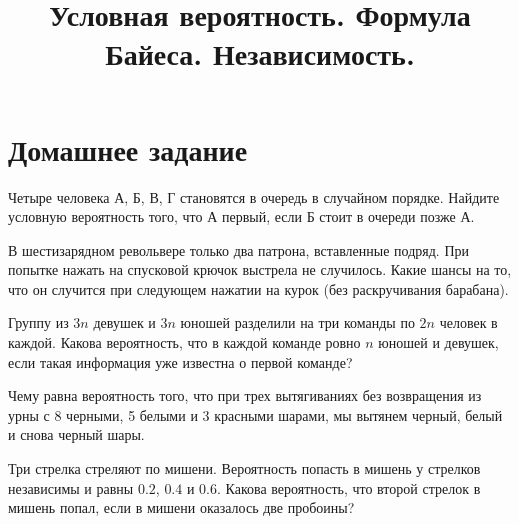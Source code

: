

\title{Условная вероятность. Формула Байеса. Независимость.} 
\date{\vspace{-1cm}}


\maketitle

\section*{Домашнее задание}
\begin{problem}
    Четыре человека А, Б, В, Г становятся в очередь в случайном порядке.
    Найдите условную вероятность того, что А первый, если Б стоит в очереди позже А.
\end{problem}

\begin{problem}
    В шестизарядном револьвере только два патрона, вставленные подряд.
    При попытке нажать на спусковой крючок выстрела не случилось.
    Какие шансы на то, что он случится при следующем нажатии на курок (без раскручивания барабана).
\end{problem}

\begin{problem}
    Группу из $3 n$ девушек и $3 n$ юношей разделили на три команды по $2 n$ человек в каждой.
    Какова вероятность, что в каждой команде ровно $n$ юношей и девушек, если такая информация уже известна о первой команде?
\end{problem}

\begin{problem}
    Чему равна вероятность того, что при трех вытягиваниях без возвращения из урны с 8 черными, 5 белыми и 3 красными шарами, мы вытянем черный, белый и снова черный шары.
\end{problem}

\begin{problem}
    Три стрелка стреляют по мишени.
    Вероятность попасть в мишень у стрелков независимы и равны $0.2$, $0.4$ и $0.6$.
    Какова вероятность, что второй стрелок в мишень попал, если в мишени оказалось две пробоины?
\end{problem}

